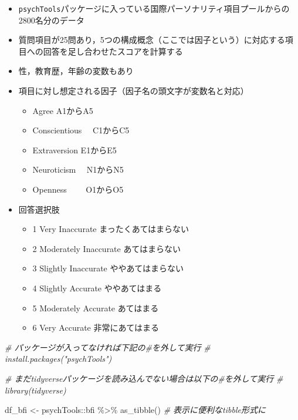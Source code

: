 \documentclass[
  xelatex,ja=standard, b5paper]{bxjsbook}
\newenvironment{Shaded}{\begin{snugshade}}{\end{snugshade}}
\newcommand{\CommentTok}[1]{\textcolor[rgb]{0.56,0.35,0.01}{\textit{#1}}}
\newcommand{\FunctionTok}[1]{\textcolor[rgb]{0.00,0.00,0.00}{#1}}
\newcommand{\NormalTok}[1]{#1}
\newcommand{\OtherTok}[1]{\textcolor[rgb]{0.56,0.35,0.01}{#1}}
\newcommand{\SpecialCharTok}[1]{\textcolor[rgb]{0.00,0.00,0.00}{#1}}
\providecommand{\tightlist}{%
  \setlength{\itemsep}{0pt}\setlength{\parskip}{0pt}}
\begin{document}
\begin{itemize}
\tightlist
\item
  \texttt{psychTools}パッケージに入っている国際パーソナリティ項目プールからの2800名分のデータ
\item
  質問項目が25問あり，5つの構成概念（ここでは因子という）に対応する項目への回答を足し合わせたスコアを計算する
\item
  性，教育歴，年齢の変数もあり
\item
  項目に対し想定される因子（因子名の頭文字が変数名と対応）

  \begin{itemize}
  \tightlist
  \item
    Agree A1からA5
  \item
    Conscientious　 C1からC5
  \item
    Extraversion E1からE5
  \item
    Neuroticism　 N1からN5
  \item
    Openness　　 O1からO5
  \end{itemize}
\item
  回答選択肢

  \begin{itemize}
  \tightlist
  \item
    1 Very Inaccurate まったくあてはまらない
  \item
    2 Moderately Inaccurate あてはまらない
  \item
    3 Slightly Inaccurate ややあてはまらない
  \item
    4 Slightly Accurate ややあてはまる
  \item
    5 Moderately Accurate あてはまる
  \item
    6 Very Accurate 非常にあてはまる
  \end{itemize}
\end{itemize}

\begin{Shaded}
\begin{Highlighting}[]
\CommentTok{\# パッケージが入ってなければ下記の\#を外して実行}
\CommentTok{\# install.packages("psychTools")}

\CommentTok{\# まだtidyverseパッケージを読み込んでない場合は以下の\#を外して実行}
\CommentTok{\# library(tidyverse)}

\NormalTok{df\_bfi }\OtherTok{\textless{}{-}} 
\NormalTok{  psychTools}\SpecialCharTok{::}\NormalTok{bfi }\SpecialCharTok{\%\textgreater{}\%} 
  \FunctionTok{as\_tibble}\NormalTok{()         }\CommentTok{\# 表示に便利なtibble形式に}
\end{Highlighting}
\end{Shaded}
\end{document}
